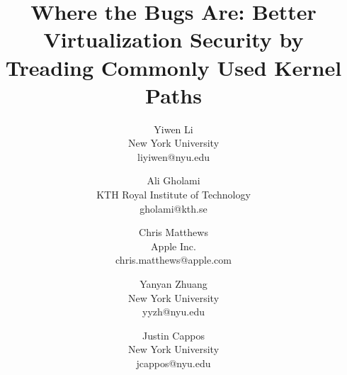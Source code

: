 \documentclass[letterpaper,twocolumn,10pt]{article}
\begin{document}




\title{\Large \bf{Where the Bugs Are: Better Virtualization Security by \\Treading
Commonly Used Kernel Paths}}


\author{
{\rm Yiwen Li}\\
New York University \\
liyiwen@nyu.edu
\and
{\rm Ali Gholami}\\
KTH Royal Institute of Technology\\
gholami@kth.se
\and
{\rm Chris Matthews}\\
Apple Inc. \\
chris.matthews@apple.com
\and
{\rm Yanyan Zhuang}\\
New York University \\
yyzh@nyu.edu
\and
{\rm Justin Cappos}\\
New York University \\
jcappos@nyu.edu
} %


\maketitle


\thispagestyle{empty}



















{
\footnotesize


}



\end{document}
